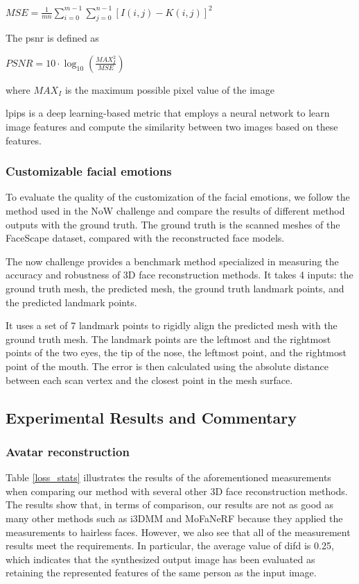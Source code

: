 $MSE = \frac{1}{mn}\sum_{i=0}^{m-1}\sum_{j=0}^{n-1}[I(i,j)-K(i,j)]^2$

The \acrshort{psnr} is defined as

$PSNR = 10\cdot\log_{10}(\frac{MAX_I^2}{MSE})$

where $MAX_{I}$ is the maximum possible pixel value of the image

\acrshort{lpips} is a deep learning-based metric that employs a neural network to learn image features and compute the similarity between two images based on these features.

\subsubsection{Customizable facial emotions}
To evaluate the quality of the customization of the facial emotions, we follow the method used in the NoW challenge and compare the results of different method outputs with the ground truth. The ground truth is the scanned meshes of the FaceScape dataset, compared with the reconstructed face models.

The \acrshort{now} challenge\cite{RingNet:CVPR:2019} provides a benchmark method specialized in measuring the accuracy and robustness of 3D face reconstruction methods. It takes 4 inputs: the ground truth mesh, the predicted mesh, the ground truth landmark points, and the predicted landmark points.

It uses a set of 7 landmark points to rigidly align the predicted mesh with the ground truth mesh. The landmark points are the leftmost and the rightmost points of the two eyes, the tip of the nose, the leftmost point, and the rightmost point of the mouth. The error is then calculated using the absolute distance between each scan vertex and the closest point in the mesh surface.


\subsection{Experimental Results and Commentary}
\subsubsection{Avatar reconstruction}

Table \ref{loss_stats} illustrates the results of the aforementioned measurements when comparing our method with several other 3D face reconstruction methods. The results show that, in terms of comparison, our results are not as good as many other methods such as i3DMM and MoFaNeRF because they applied the measurements to hairless faces. However, we also see that all of the measurement results meet the requirements. In particular, the average value of \acrshort{difd} is 0.25, which indicates that the synthesized output image has been evaluated as retaining the represented features of the same person as the input image.

